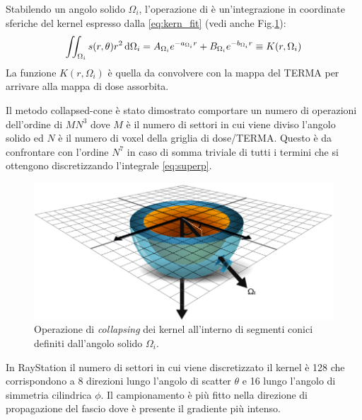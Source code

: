 {Stabilendo un angolo solido $\Omega_i$, l'operazione di  è un'integrazione in coordinate sferiche del kernel espresso dalla \eqref{eq:kern_fit} (vedi anche Fig.\ref{fig:kern_collaps}):
\begin{equation}
\iint_{\Omega_i} s(r,\theta) r^2\,\text{d} \Omega_i = A_{\Omega_i} e^{-a_{\Omega_i} r} + B_{\Omega_i} e^{-b_{\Omega_i} r} \equiv K(r,\Omega_i)
\end{equation}
La funzione $K(r,\Omega_i)$ è quella da convolvere con la mappa del TERMA per arrivare alla mappa di dose assorbita.

Il metodo collapsed-cone è stato dimostrato \cite{Ahnesjo1999} comportare un numero di operazioni dell'ordine di $MN^3$ dove $M$ è il numero di settori in cui viene diviso l'angolo solido ed $N$ è il numero di voxel della griglia di dose/TERMA. Questo è da confrontare con l'ordine $N^7$ in caso di somma triviale di tutti i termini che si ottengono discretizzando l'integrale \eqref{eq:superp}.

\begin{figure}
\centering
\includegraphics[width=\textwidth]{./cap1/kern_collaps.png}
\caption{Operazione di \textit{collapsing} dei kernel all'interno di segmenti conici definiti dall'angolo solido $\Omega_i$.}
\label{fig:kern_collaps}
\end{figure}

In RayStation il numero di settori in cui viene discretizzato il kernel è 128 che corrispondono a 8 direzioni lungo l'angolo di scatter $\theta$ e 16 lungo l'angolo di simmetria cilindrica $\phi$. Il campionamento è più fitto nella direzione di propagazione del fascio dove è presente il gradiente più intenso.

}
